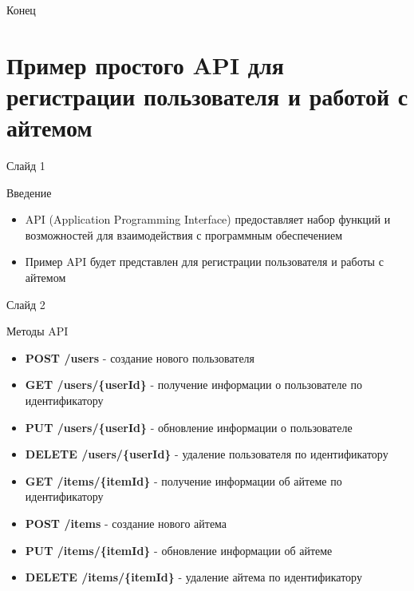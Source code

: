\documentclass[
  ignorenonframetext,
  aspectratio=169,
  aspectratio=169]{beamer}
\providecommand{\tightlist}{%
  \setlength{\itemsep}{0pt}\setlength{\parskip}{0pt}}
\begin{document}
\begin{frame}{Конец}
\protect\hypertarget{ux43aux43eux43dux435ux446}{}
\end{frame}

\hypertarget{ux43fux440ux438ux43cux435ux440-ux43fux440ux43eux441ux442ux43eux433ux43e-api-ux434ux43bux44f-ux440ux435ux433ux438ux441ux442ux440ux430ux446ux438ux438-ux43fux43eux43bux44cux437ux43eux432ux430ux442ux435ux43bux44f-ux438-ux440ux430ux431ux43eux442ux43eux439-ux441-ux430ux439ux442ux435ux43cux43eux43c}{%
\section{Пример простого API для регистрации пользователя и работой с
айтемом}\label{ux43fux440ux438ux43cux435ux440-ux43fux440ux43eux441ux442ux43eux433ux43e-api-ux434ux43bux44f-ux440ux435ux433ux438ux441ux442ux440ux430ux446ux438ux438-ux43fux43eux43bux44cux437ux43eux432ux430ux442ux435ux43bux44f-ux438-ux440ux430ux431ux43eux442ux43eux439-ux441-ux430ux439ux442ux435ux43cux43eux43c}}

\begin{frame}{Слайд 1}
\protect\hypertarget{ux441ux43bux430ux439ux434-1-1}{}
\begin{block}{Введение}
\protect\hypertarget{ux432ux432ux435ux434ux435ux43dux438ux435}{}
\begin{itemize}
\tightlist
\item
  API (Application Programming Interface) предоставляет набор функций и
  возможностей для взаимодействия с программным обеспечением
\item
  Пример API будет представлен для регистрации пользователя и работы с
  айтемом
\end{itemize}
\end{block}
\end{frame}

\begin{frame}{Слайд 2}
\protect\hypertarget{ux441ux43bux430ux439ux434-2-1}{}
\begin{block}{Методы API}
\protect\hypertarget{ux43cux435ux442ux43eux434ux44b-api}{}
\begin{itemize}
\tightlist
\item
  \textbf{POST /users} - создание нового пользователя
\item
  \textbf{GET /users/\{userId\}} - получение информации о пользователе
  по идентификатору
\item
  \textbf{PUT /users/\{userId\}} - обновление информации о пользователе
\item
  \textbf{DELETE /users/\{userId\}} - удаление пользователя по
  идентификатору
\item
  \textbf{GET /items/\{itemId\}} - получение информации об айтеме по
  идентификатору
\item
  \textbf{POST /items} - создание нового айтема
\item
  \textbf{PUT /items/\{itemId\}} - обновление информации об айтеме
\item
  \textbf{DELETE /items/\{itemId\}} - удаление айтема по идентификатору
\end{itemize}
\end{block}
\end{frame}
\end{document}
